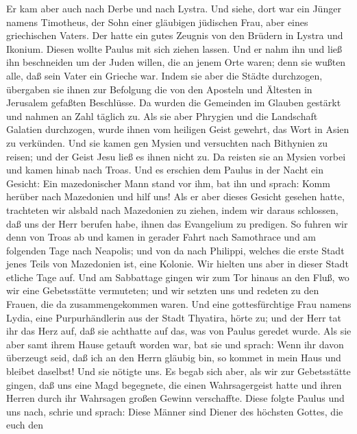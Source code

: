  Er kam aber auch nach Derbe und nach Lystra. Und siehe,
dort war ein Jünger namens Timotheus, der Sohn einer gläubigen jüdischen
Frau, aber eines griechischen Vaters.  Der hatte ein gutes
Zeugnis von den Brüdern in Lystra und Ikonium.  Diesen
wollte Paulus mit sich ziehen lassen. Und er nahm ihn und ließ ihn
beschneiden um der Juden willen, die an jenem Orte waren; denn sie
wußten alle, daß sein Vater ein Grieche war.  Indem sie
aber die Städte durchzogen, übergaben sie ihnen zur Befolgung die von
den Aposteln und Ältesten in Jerusalem gefaßten Beschlüsse.
 Da wurden die Gemeinden im Glauben gestärkt und nahmen an
Zahl täglich zu.  Als sie aber Phrygien und die Landschaft
Galatien durchzogen, wurde ihnen vom heiligen Geist gewehrt, das Wort in
Asien zu verkünden.  Und sie kamen gen Mysien und
versuchten nach Bithynien zu reisen; und der Geist Jesu ließ es ihnen
nicht zu.  Da reisten sie an Mysien vorbei und kamen hinab
nach Troas.  Und es erschien dem Paulus in der Nacht ein
Gesicht: Ein mazedonischer Mann stand vor ihm, bat ihn und sprach: Komm
herüber nach Mazedonien und hilf uns!  Als er aber dieses
Gesicht gesehen hatte, trachteten wir alsbald nach Mazedonien zu ziehen,
indem wir daraus schlossen, daß uns der Herr berufen habe, ihnen das
Evangelium zu predigen.  So fuhren wir denn von Troas ab
und kamen in gerader Fahrt nach Samothrace und am folgenden Tage nach
Neapolis;  und von da nach Philippi, welches die erste
Stadt jenes Teils von Mazedonien ist, eine Kolonie. Wir hielten uns aber
in dieser Stadt etliche Tage auf.  Und am Sabbattage
gingen wir zum Tor hinaus an den Fluß, wo wir eine Gebetsstätte
vermuteten; und wir setzten uns und redeten zu den Frauen, die da
zusammengekommen waren.  Und eine gottesfürchtige Frau
namens Lydia, eine Purpurhändlerin aus der Stadt Thyatira, hörte zu; und
der Herr tat ihr das Herz auf, daß sie achthatte auf das, was von Paulus
geredet wurde.  Als sie aber samt ihrem Hause getauft
worden war, bat sie und sprach: Wenn ihr davon überzeugt seid, daß ich
an den Herrn gläubig bin, so kommet in mein Haus und bleibet daselbst!
Und sie nötigte uns.  Es begab sich aber, als wir zur
Gebetsstätte gingen, daß uns eine Magd begegnete, die einen
Wahrsagergeist hatte und ihren Herren durch ihr Wahrsagen großen Gewinn
verschaffte.  Diese folgte Paulus und uns nach, schrie
und sprach: Diese Männer sind Diener des höchsten Gottes, die euch den
